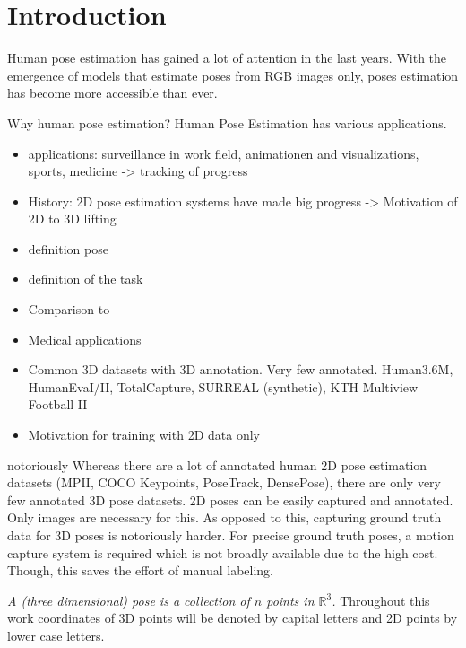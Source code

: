 \section{Introduction}

Human pose estimation has gained a lot of attention in the last years.
With the emergence of models that estimate poses from RGB images only, poses estimation has become more accessible than ever.


Why human pose estimation?
Human Pose Estimation has various applications.




\begin{itemize}
	\item applications: surveillance in work field, animationen and visualizations, sports, medicine -> tracking of progress
	\item History: 2D pose estimation systems have made big progress -> Motivation of 2D to 3D lifting
	\item definition pose
	\item definition of the task
	\item Comparison to \citet{wandt19}
	\item Medical applications \cite{aroeira16, khan18}
\end{itemize}

\begin{itemize}
	\item Common 3D datasets with 3D annotation. Very few annotated. Human3.6M, HumanEvaI/II, TotalCapture, SURREAL (synthetic), KTH Multiview Football II
	\item Motivation for training with 2D data only
\end{itemize}

notoriously
Whereas there are a lot of annotated human 2D pose estimation datasets (MPII, COCO Keypoints, PoseTrack, DensePose), there are only very few annotated 3D pose datasets. 
2D poses can be easily captured and annotated.
Only images are necessary for this.
As opposed to this, capturing ground truth data for 3D poses is notoriously harder.
For precise ground truth poses, a motion capture system is required which is not broadly available due to the high cost.
Though, this saves the effort of manual labeling.


\emph{A (three dimensional) \textit{pose} is a collection of $n$ points in $\mathbb{R}^3$.}
Throughout this work coordinates of 3D points will be denoted by capital letters and 2D points by lower case letters.

